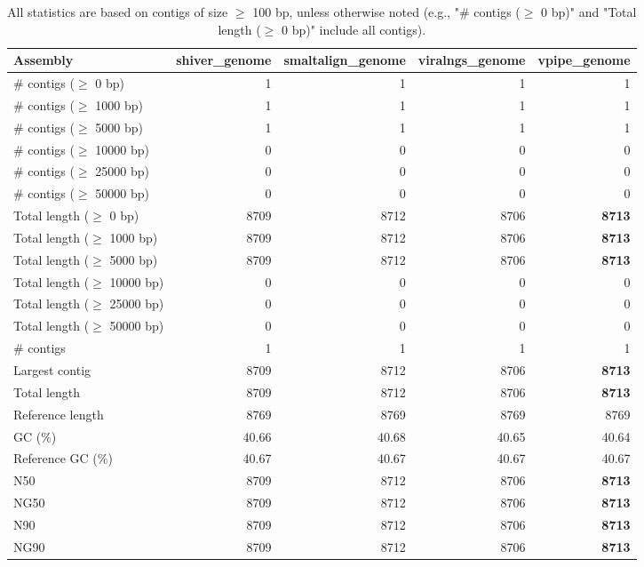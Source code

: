\documentclass[12pt,a4paper]{article}
\begin{document}
\begin{table}[ht]
\begin{center}
\caption{All statistics are based on contigs of size $\geq$ 100 bp, unless otherwise noted (e.g., "\# contigs ($\geq$ 0 bp)" and "Total length ($\geq$ 0 bp)" include all contigs).}
\begin{tabular}{|l*{4}{|r}|}
\hline
Assembly & shiver\_genome & smaltalign\_genome & viralngs\_genome & vpipe\_genome \\ \hline
\# contigs ($\geq$ 0 bp) & 1 & 1 & 1 & 1 \\ \hline
\# contigs ($\geq$ 1000 bp) & 1 & 1 & 1 & 1 \\ \hline
\# contigs ($\geq$ 5000 bp) & 1 & 1 & 1 & 1 \\ \hline
\# contigs ($\geq$ 10000 bp) & 0 & 0 & 0 & 0 \\ \hline
\# contigs ($\geq$ 25000 bp) & 0 & 0 & 0 & 0 \\ \hline
\# contigs ($\geq$ 50000 bp) & 0 & 0 & 0 & 0 \\ \hline
Total length ($\geq$ 0 bp) & 8709 & 8712 & 8706 & {\bf 8713} \\ \hline
Total length ($\geq$ 1000 bp) & 8709 & 8712 & 8706 & {\bf 8713} \\ \hline
Total length ($\geq$ 5000 bp) & 8709 & 8712 & 8706 & {\bf 8713} \\ \hline
Total length ($\geq$ 10000 bp) & 0 & 0 & 0 & 0 \\ \hline
Total length ($\geq$ 25000 bp) & 0 & 0 & 0 & 0 \\ \hline
Total length ($\geq$ 50000 bp) & 0 & 0 & 0 & 0 \\ \hline
\# contigs & 1 & 1 & 1 & 1 \\ \hline
Largest contig & 8709 & 8712 & 8706 & {\bf 8713} \\ \hline
Total length & 8709 & 8712 & 8706 & {\bf 8713} \\ \hline
Reference length & 8769 & 8769 & 8769 & 8769 \\ \hline
GC (\%) & 40.66 & 40.68 & 40.65 & 40.64 \\ \hline
Reference GC (\%) & 40.67 & 40.67 & 40.67 & 40.67 \\ \hline
N50 & 8709 & 8712 & 8706 & {\bf 8713} \\ \hline
NG50 & 8709 & 8712 & 8706 & {\bf 8713} \\ \hline
N90 & 8709 & 8712 & 8706 & {\bf 8713} \\ \hline
NG90 & 8709 & 8712 & 8706 & {\bf 8713} \\ \hline

\end{tabular}
\end{center}
\end{table}
\end{document}
